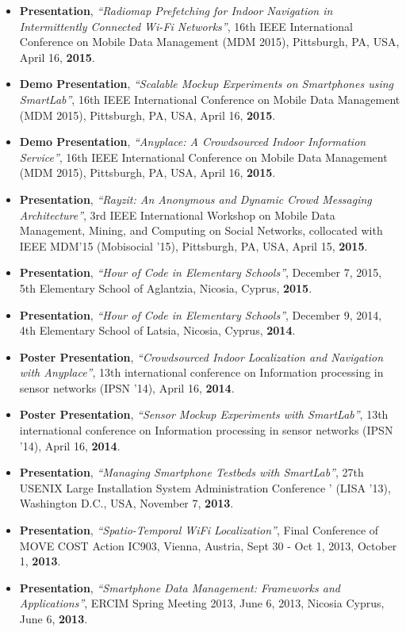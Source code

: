\documentclass[10pt]{article}
\begin{document}
\begin{itemize}
\item {\bf Presentation}, {\em ``Radiomap Prefetching for Indoor Navigation in Intermittently Connected Wi-Fi Networks''}, 16th IEEE International Conference on Mobile Data Management (MDM 2015), Pittsburgh, PA, USA, April 16, {\bf 2015}.
\item {\bf Demo Presentation}, {\em ``Scalable Mockup Experiments on Smartphones using SmartLab''}, 16th IEEE International Conference on Mobile Data Management (MDM 2015), Pittsburgh, PA, USA, April 16, {\bf 2015}.
\item {\bf Demo Presentation}, {\em ``Anyplace: A Crowdsourced Indoor Information Service''}, 16th IEEE International Conference on Mobile Data Management (MDM 2015), Pittsburgh, PA, USA, April 16, {\bf 2015}.
\item {\bf Presentation}, {\em ``Rayzit: An Anonymous and Dynamic Crowd Messaging Architecture''}, 3rd IEEE International Workshop on Mobile Data Management, Mining, and Computing on Social Networks, collocated with IEEE MDM'15 (Mobisocial '15), Pittsburgh, PA, USA, April 15, {\bf 2015}.
\item  {\bf Presentation}, {\em ``Hour of Code in Elementary Schools''}, December 7, 2015, 5th Elementary School of Aglantzia, Nicosia, Cyprus, {\bf 2015}.
\item  {\bf Presentation}, {\em ``Hour of Code in Elementary Schools''}, December 9, 2014, 4th Elementary School of Latsia, Nicosia, Cyprus, {\bf 2014}.
\item  {\bf Poster Presentation}, {\em ``Crowdsourced Indoor Localization and Navigation with Anyplace''}, 13th international conference on Information processing in sensor networks (IPSN '14), April 16, {\bf 2014}.
\item  {\bf Poster Presentation}, {\em ``Sensor Mockup Experiments with SmartLab''}, 13th international conference on Information processing in sensor networks (IPSN '14), April 16, {\bf 2014}.
\item  {\bf Presentation}, {\em ``Managing Smartphone Testbeds with SmartLab''}, 27th USENIX Large Installation System Administration Conference ' (LISA '13), Washington D.C., USA, November 7, {\bf 2013}.
\item  {\bf Presentation}, {\em ``Spatio-Temporal WiFi Localization''}, Final Conference of MOVE COST Action IC903, Vienna, Austria, Sept 30 - Oct 1, 2013, October 1, {\bf 2013}.
\item  {\bf Presentation}, {\em ``Smartphone Data Management: Frameworks and Applications''}, ERCIM Spring Meeting 2013, June 6, 2013, Nicosia Cyprus, June 6, {\bf 2013}.

\end{itemize}
\end{document}
